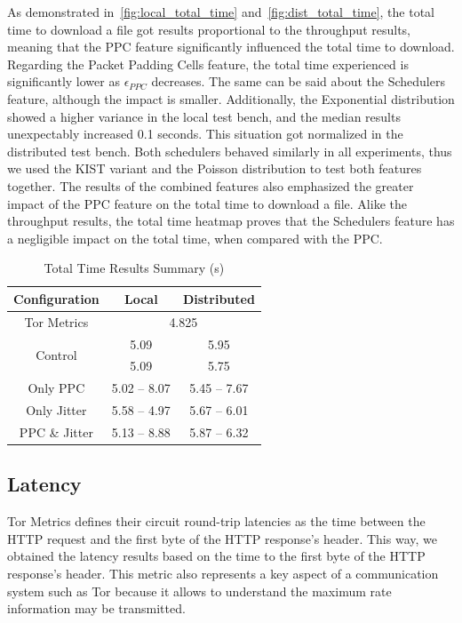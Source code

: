 As demonstrated in~\autoref{fig:local_total_time} and~\autoref{fig:dist_total_time}, the total time to download a file got results proportional to the throughput results, meaning that the PPC feature significantly influenced the total time to download. Regarding the Packet Padding Cells feature, the total time experienced is significantly lower as $\epsilon_{PPC}$ decreases. The same can be said about the Schedulers feature, although the impact is smaller. Additionally, the Exponential distribution showed a higher variance in the local test bench, and the median results unexpectably increased 0.1 seconds. This situation got normalized in the distributed test bench.   
Both schedulers behaved similarly in all experiments, thus we used the KIST variant and the Poisson distribution to test both features together. The results of the combined features also emphasized the greater impact of the PPC feature on the total time to download a file. Alike the throughput results, the total time heatmap proves that the Schedulers feature has a negligible impact on the total time, when compared with the PPC.\@
\begin{table}[htbp]
    \centering
    \begin{tabular}{|c|c|c|}
    \hline
    \textbf{Configuration} & \textbf{Local} & \textbf{Distributed} \\
    \hline
    Tor Metrics &  \multicolumn{2}{c|}{4.825} \\ 
    \hline
    \multirow{2}{*}{Control} & 5.09 & 5.95\\ 
    & 5.09 & 5.75\\
    \hline
    Only PPC & 5.02 – 8.07 & 5.45 – 7.67\\
    \hline
    Only Jitter & 5.58 – 4.97 & 5.67 – 6.01\\
    \hline
    PPC \& Jitter & 5.13 – 8.88 & 5.87 – 6.32\\
    \hline
    \end{tabular}
    \caption{Total Time Results Summary (s)}\label{tab:total_time_summary}
\end{table}

\FloatBarrier
\subsection{Latency}

Tor Metrics defines their circuit round-trip latencies as the time between the HTTP request and the first byte of the HTTP response's header. This way, we obtained the latency results based on the time to the first byte of the HTTP response's header. This metric also represents a key aspect of a communication system such as Tor because it allows to understand the maximum rate information may be transmitted. 

